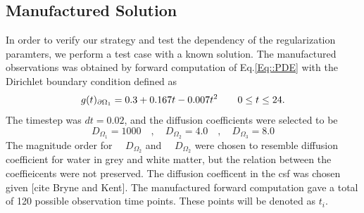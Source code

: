 \documentclass[11pt,a4paper]{article}
\begin{document}
\subsection*{Manufactured Solution}
In order to verify our strategy and test the dependency of the
regularization paramters, we perform a test case with a
known solution.  
The manufactured observations was obtained by forward computation of Eq.\ref{Eq::PDE} with the Dirichlet boundary condition defined as
\begin{equation}
g(t)_{\partial \Omega_1} = 0.3 +0.167t - 0.007t\sp{2} \qquad  0 \leq t \leq 24.
\label{EQ::DIRI}
\end{equation}
The timestep was $dt = 0.02$, and the diffusion coefficients were selected to be 
\begin{equation}
D_{\Omega_1} = 1000 \quad , \quad D_{\Omega_2} = 4.0 \quad , \quad D_{\Omega_3} = 8.0 
\end{equation}  
The magnitude order for $\quad D_{\Omega_2} $ and $\quad D_{\Omega_2}$ were chosen to resemble diffusion coefficient for water in grey and white matter, but the relation between the coeffieicents were not preserved. The diffusion coefficent in the csf was chosen given [cite Bryne and Kent]. The manufactured forward computation gave a total of 120 possible observation time points. These points will be denoted as $t_i$.
\end{document}
